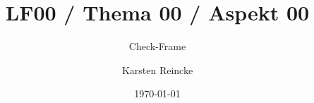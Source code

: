 \documentclass[]{beamer}
\title{LF00 / Thema 00 / Aspekt 00}
\subtitle{Check-Frame}
\institute{GS-LDK}
\author{Karsten Reincke}
\date{\today}
\def\cfgGl{../../../../cfg.gl/}
\begin{document}
\begin{frame}
  \titlepage
\end{frame}





\logo{}

\end{document}
